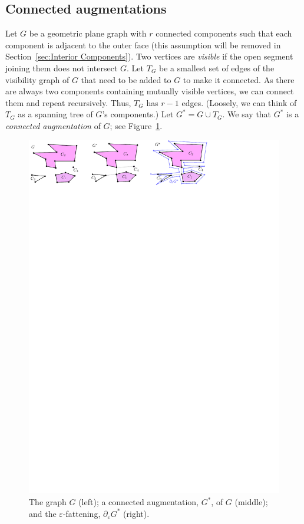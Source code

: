 \documentclass[11pt]{patmorin}
\begin{document}
\subsection{Connected augmentations}\label{section: connected augmentations}
Let $G$ be a geometric plane graph with $r$ connected components such that each component is adjacent to the outer face (this assumption will be removed in Section~\ref{sec:Interior Components}).
Two vertices are {\em visible} if the open segment joining them does not intersect $G$.
Let $T_G$ be a smallest set of edges of the visibility graph of $G$ that need to be added to $G$ to make it connected.
As there are always two components containing mutually visible vertices, we can connect them and repeat recursively.  Thus, $T_G$ has $r-1$ edges. (Loosely, we can think of $T_G$ as a spanning tree of $G$'s components.) Let $G^* = G\cup T_G$.  We say that $G^*$ is a \emph{connected augmentation} of $G$; see Figure~\ref{fig:Blowing}.

\begin{figure}[tb]
\centering
\includegraphics{img/Blowing.pdf}
\caption{The graph $G$ (left); a connected augmentation, $G^*$, of $G$ (middle); and the $\varepsilon$-fattening, $\partial_\varepsilon G^*$ (right).}
\label{fig:Blowing}
\end{figure}
\end{document}
